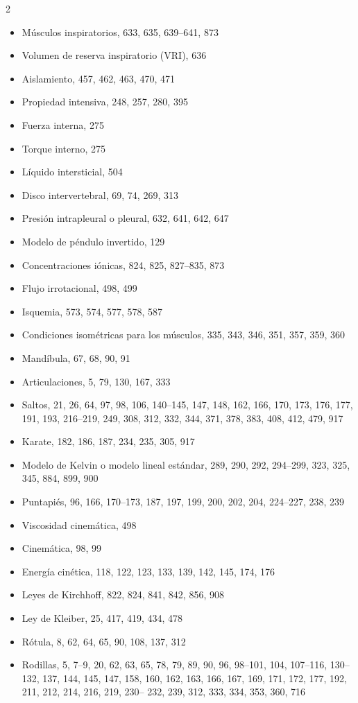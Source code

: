 \documentclass[12pt,a4paper]{book}
\begin{document}
\begin{multicols}{2}
\begin{itemize}[leftmargin=*]
  \item Músculos inspiratorios, 633, 635, 639--641, 873
  \item Volumen de reserva inspiratorio (VRI), 636
  \item Aislamiento, 457, 462, 463, 470, 471
  \item Propiedad intensiva, 248, 257, 280, 395
  \item Fuerza interna, 275
  \item Torque interno, 275
  \item Líquido intersticial, 504
  \item Disco intervertebral, 69, 74, 269, 313
  \item Presión intrapleural o pleural, 632, 641, 642, 647
  \item Modelo de péndulo invertido, 129
  \item Concentraciones iónicas, 824, 825, 827--835, 873
  \item Flujo irrotacional, 498, 499
  \item Isquemia, 573, 574, 577, 578, 587
  \item Condiciones isométricas para los músculos, 335, 343, 346, 351, 357, 359, 360
  \item Mandíbula, 67, 68, 90, 91
  \item Articulaciones, 5, 79, 130, 167, 333
  \item Saltos, 21, 26, 64, 97, 98, 106, 140--145, 147, 148, 162, 166, 170, 173, 176, 177, 191, 193, 216--219, 249, 308, 312, 332, 344, 371, 378, 383, 408, 412, 479, 917
  \item Karate, 182, 186, 187, 234, 235, 305, 917
  \item Modelo de Kelvin o modelo lineal estándar, 289, 290, 292, 294--299, 323, 325, 345, 884, 899, 900
  \item Puntapiés, 96, 166, 170--173, 187, 197, 199, 200, 202, 204, 224--227, 238, 239
  \item Viscosidad cinemática, 498
  \item Cinemática, 98, 99
  \item Energía cinética, 118, 122, 123, 133, 139, 142, 145, 174, 176
  \item Leyes de Kirchhoff, 822, 824, 841, 842, 856, 908
  \item Ley de Kleiber, 25, 417, 419, 434, 478
  \item Rótula, 8, 62, 64, 65, 90, 108, 137, 312
  \item Rodillas, 5, 7--9, 20, 62, 63, 65, 78, 79, 89, 90, 96, 98--101, 104, 107--116, 130--132, 137, 144, 145, 147, 158, 160, 162, 163, 166, 167, 169, 171, 172, 177, 192, 211, 212, 214, 216, 219, 230-- 232, 239, 312, 333, 334, 353, 360, 716

\end{itemize}
\end{multicols}
\end{document}
